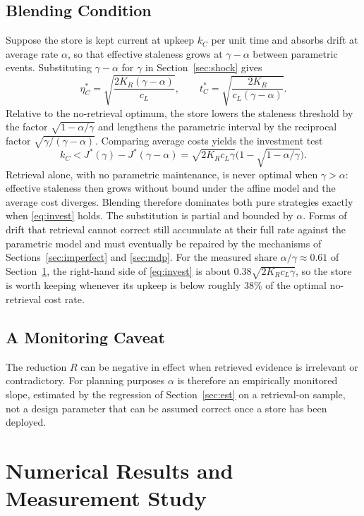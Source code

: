 \documentclass[journal]{IEEEtran}
\begin{document}
\subsection{Blending Condition}
Suppose the store is kept current at upkeep $k_C$ per unit time and absorbs drift at average rate $\alpha$, so that effective staleness grows at $\gamma-\alpha$ between parametric events. Substituting $\gamma-\alpha$ for $\gamma$ in Section~\ref{sec:shock} gives
\begin{equation}
\eta_C^\ast=\sqrt{\frac{2K_R(\gamma-\alpha)}{c_L}},\qquad t_C^\ast=\sqrt{\frac{2K_R}{c_L(\gamma-\alpha)}}.
\label{eq:retr}
\end{equation}
Relative to the no-retrieval optimum, the store lowers the staleness threshold by the factor $\sqrt{1-\alpha/\gamma}$ and lengthens the parametric interval by the reciprocal factor $\sqrt{\gamma/(\gamma-\alpha)}$. Comparing average costs yields the investment test
\begin{equation}
k_C<J^\ast(\gamma)-J^\ast(\gamma-\alpha)=\sqrt{2K_Rc_L\gamma}\Big(1-\sqrt{1-\alpha/\gamma}\Big).
\label{eq:invest}
\end{equation}
Retrieval alone, with no parametric maintenance, is never optimal when $\gamma>\alpha$: effective staleness then grows without bound under the affine model and the average cost diverges. Blending therefore dominates both pure strategies exactly when \eqref{eq:invest} holds. The substitution is partial and bounded by $\alpha$. Forms of drift that retrieval cannot correct still accumulate at their full rate against the parametric model and must eventually be repaired by the mechanisms of Sections~\ref{sec:imperfect} and \ref{sec:mdp}. For the measured share $\alpha/\gamma\approx0.61$ of Section~\ref{sec:num}, the right-hand side of \eqref{eq:invest} is about $0.38\sqrt{2K_Rc_L\gamma}$, so the store is worth keeping whenever its upkeep is below roughly 38\% of the optimal no-retrieval cost rate.

\subsection{A Monitoring Caveat}
The reduction $R$ can be negative in effect when retrieved evidence is irrelevant or contradictory. For planning purposes $\alpha$ is therefore an empirically monitored slope, estimated by the regression of Section~\ref{sec:est} on a retrieval-on sample, not a design parameter that can be assumed correct once a store has been deployed.

\section{Numerical Results and Measurement Study}\label{sec:num}
\end{document}
